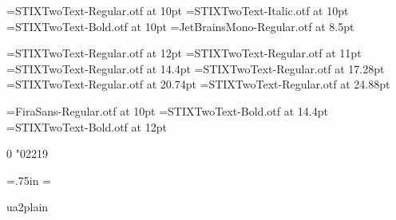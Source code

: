  
\nonstopmode

\font\tenrm=STIXTwoText-Regular.otf at 10pt
\font\tenit=STIXTwoText-Italic.otf at 10pt
\font\tenbf=STIXTwoText-Bold.otf at 10pt
\font\tentt=JetBrainsMono-Regular.otf at 8.5pt

\font\brm=STIXTwoText-Regular.otf at 12pt
\font\halfrm=STIXTwoText-Regular.otf at 11pt
\font\bbrm=STIXTwoText-Regular.otf at 14.4pt
\font\bbbrm=STIXTwoText-Regular.otf at 17.28pt
\font\bbbbrm=STIXTwoText-Regular.otf at 20.74pt
\font\bbbbbrm=STIXTwoText-Regular.otf at 24.88pt

\font\sf=FiraSans-Regular.otf at 10pt
\font\chapfont=STIXTwoText-Bold.otf at 14.4pt
\font\secfont=STIXTwoText-Bold.otf at 12pt

\Umathchardef{} 0 "02219
\def\dag{\ifmmode\dagger\else$\dagger$\fi}
\def\ddag{\ifmmode\ddagger\else$\ddagger$\fi}
\def\S{\ifmmode\mathsection\else$\mathsection$\fi}
\def\P{\ifmmode\mathparagraph\else$\mathparagraph$\fi}
\def\to{\rightarrow}
\def\gets{\leftarrow}
\def\infty{\Umathchar 0 0 "0221E }
\def\ge{\geq}
\def\le{\leq}

\def\star{\Umathchar 2 0 "02216 }
\def\circ{\Umathchar 2 0 "02218 }
\def\div{\Umathchar 2 0 "000F7 }
\def\diamond{\Umathchar 2 0 "022C4 }
\def\cap{\Umathchar 2 0 "02229 }
\def\cup{\Umathchar 2 0 "0222A }
\def\varepsilon{\Umathchar 7 0 "003B5 }
\def\vartheta{\Umathchar 7 0 "003D1 }
\def\varrho{\Umathchar 7 0 "003F1 }
\def\varphi{\Umathchar 7 0 "003D5 }
\def\chi{\Umathchar 7 0 "003C7 }

\newif\ifcanspell \canspelltrue
\let\center=\centerline
 
 
\raggedbottom      %
\hsize=5.5in 
\vsize=7in 
\voffset=.75in 
\parskip=\baselineskip 
{}   %
 

\def\shouldbefmt{ua2plain}
\ifx\shouldbefmt\fmtname
\else
\immediate{}
\immediate{}
\immediate{}
\immediate{}
\immediate{}
\immediate{}
\immediate{}
\fi

